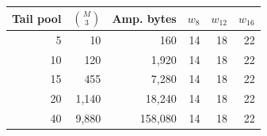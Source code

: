 \begin{tabular}{rrrrrr}
\toprule
Tail pool & $\binom{M}{3}$ & Amp. bytes & $w_8$ & $w_{12}$ & $w_{16}$\\
\midrule
5 & 10 & 160 & 14 & 18 & 22\\
10 & 120 & 1,920 & 14 & 18 & 22\\
15 & 455 & 7,280 & 14 & 18 & 22\\
20 & 1,140 & 18,240 & 14 & 18 & 22\\
40 & 9,880 & 158,080 & 14 & 18 & 22\\
\bottomrule
\end{tabular}
